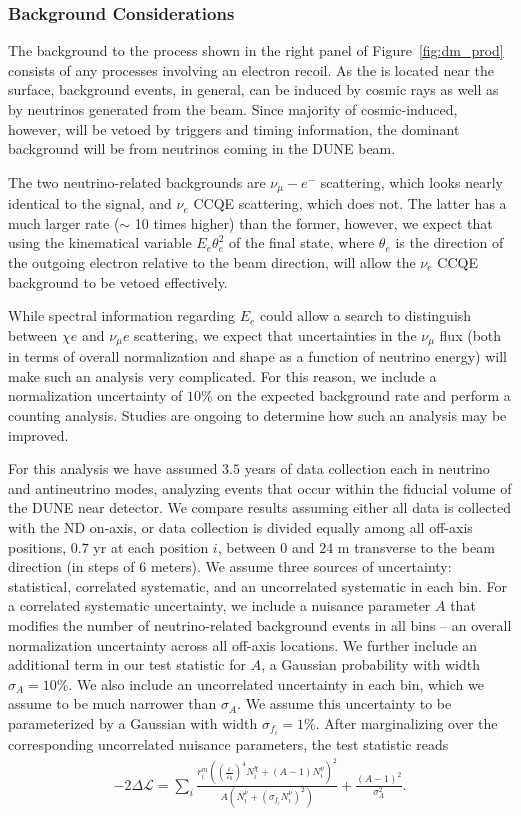 \subsubsection{Background Considerations}
 The background to the process shown in the right panel of Figure~\ref{fig:dm_prod} consists of any processes involving an electron recoil. As the  is located near the surface, background events, in general, can be induced by cosmic rays as well as by neutrinos generated from the beam. Since majority of cosmic-induced, however, will be vetoed by triggers and timing information, the dominant background will be from neutrinos coming in the DUNE beam.

The two neutrino-related backgrounds are $\nu_\mu -e^-$ scattering, which looks nearly identical to the signal, and $\nu_e$ CCQE scattering, which does not. The latter has a much larger rate ($\sim$ 10 times higher) than the former, however, we expect that using the kinematical variable $E_e \theta_e^2$ of the final state, where $\theta_e$ is the direction of the outgoing electron relative to the beam direction, will allow the $\nu_e$ CCQE background to be vetoed effectively.

While spectral information regarding $E_e$ could allow a search to distinguish between $\chi e$ and $\nu_\mu e$ scattering, we expect that uncertainties in the $\nu_\mu$ flux (both in terms of overall normalization and shape as a function of neutrino energy) will make such an analysis very complicated. For this reason, we include a normalization uncertainty of $10\%$ on the expected background rate and perform a counting analysis. Studies are ongoing to determine how such an analysis may be improved.

For this analysis we have assumed $3.5$ years of data collection each in neutrino and antineutrino modes, analyzing events that occur within the fiducial volume of the DUNE near detector. We compare results assuming either all data is collected with the ND on-axis, or data collection is divided equally among all off-axis positions, $0.7$ yr at each position  $i$, between $0$ and $24$ m transverse to the beam direction (in steps of 6 meters).
We assume three sources of uncertainty: statistical, correlated systematic, and an uncorrelated systematic in each bin. 
For a correlated systematic uncertainty, we include a nuisance parameter $A$ that modifies the number of neutrino-related background events in all bins -- an overall normalization uncertainty across all off-axis locations. 
We further include an additional term in our test statistic for $A$, a  Gaussian probability with width $\sigma_A = 10\%$. 
We also include an uncorrelated uncertainty in each bin, which we assume to be much narrower than $\sigma_A$. 
We assume this uncertainty to be parameterized by a Gaussian with width $\sigma_{f_i} = 1\%$. 
After marginalizing over the corresponding uncorrelated nuisance parameters, the test statistic reads
\begin{eqnarray}\label{eq:chisqfull}
-2\Delta \mathcal{L} = \sum_i \frac{r_i^m\left( \left(\frac{\varepsilon}{\varepsilon_0}\right)^4 N_i^\chi + (A-1)N_i^\nu\right)^2}{A\left(N_i^\nu + (\sigma_{f_i} N_i^\nu)^2 \right)} + \frac{\left(A-1\right)^2}{\sigma_A^2}.
\end{eqnarray}

